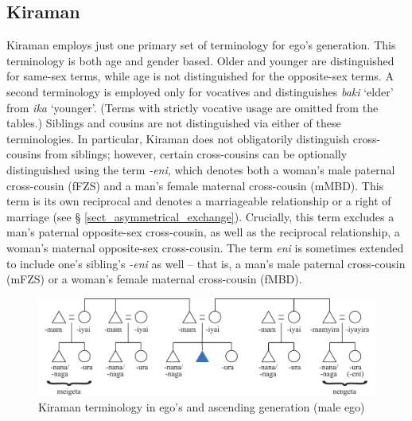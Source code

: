 \subsection{Kiraman}\label{sect_kiraman}
Kiraman employs just one primary set of terminology for ego's generation. This terminology is both age and gender based. Older and younger are distinguished for same-sex terms, while age is not distinguished for the opposite-sex terms. A second terminology is employed only for vocatives and distinguishes \textit{baki} `elder' from \textit{ika} `younger'. (Terms with strictly vocative usage are omitted from the tables.) Siblings and cousins are not distinguished via either of these terminologies. In particular, Kiraman does not obligatorily distinguish cross-cousins from siblings; however, certain cross-cousins can be optionally distinguished using the term \textit{-eni,} which denotes both a woman's male paternal cross-cousin (fFZS) and a man's female maternal cross-cousin (mMBD). This term is its own reciprocal and denotes a marriageable relationship or a right of marriage (see {\S} \ref{sect_asymmetrical_exchange}). Crucially, this term excludes a man's paternal opposite-sex cross-cousin, as well as the reciprocal relationship, a woman's maternal opposite-sex cross-cousin. The term\textit{ eni} is sometimes extended to include one's sibling's \textit{-eni} as well -- that is, a man's male paternal cross-cousin (mFZS) or a woman's female maternal cross-cousin (fMBD). 

\begin{figure}[h]
\includegraphics[width=\textwidth]{figures/Holton_ch5_fig8.pdf}
\caption{Kiraman terminology in ego's and ascending generation (male ego)}
\label{fig:5:8}
\end{figure}  


